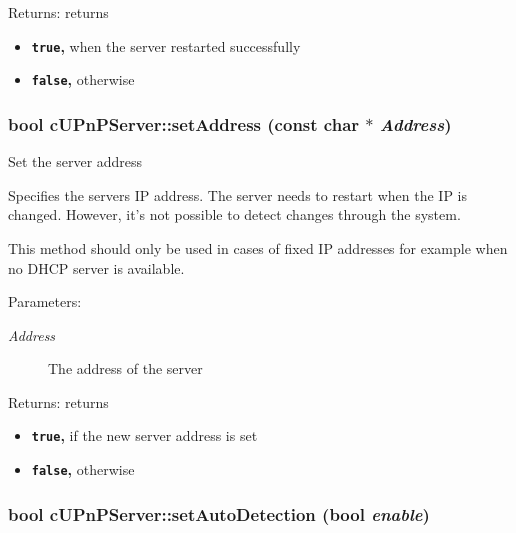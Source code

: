 \begin{Desc}
\item[Returns:]returns\begin{itemize}
\item {\bf {\tt true},} when the server restarted successfully\item {\bf {\tt false},} otherwise \end{itemize}
\end{Desc}
\hypertarget{classcUPnPServer_ebebc8d232cf4ad04e5f72f5ab763db6}{
\subsubsection[{setAddress}]{\setlength{\rightskip}{0pt plus 5cm}bool cUPnPServer::setAddress (const char $\ast$ {\em Address})}}
\label{classcUPnPServer_ebebc8d232cf4ad04e5f72f5ab763db6}


Set the server address

Specifies the servers IP address. The server needs to restart when the IP is changed. However, it's not possible to detect changes through the system.

This method should only be used in cases of fixed IP addresses for example when no DHCP server is available.

\begin{Desc}
\item[Parameters:]
\begin{description}
\item[{\em Address}]The address of the server \end{description}
\end{Desc}
\begin{Desc}
\item[Returns:]returns\begin{itemize}
\item {\bf {\tt true},} if the new server address is set\item {\bf {\tt false},} otherwise \end{itemize}
\end{Desc}
\hypertarget{classcUPnPServer_7c91df7310a99786a0a126497299d030}{
\subsubsection[{setAutoDetection}]{\setlength{\rightskip}{0pt plus 5cm}bool cUPnPServer::setAutoDetection (bool {\em enable})}}
\label{classcUPnPServer_7c91df7310a99786a0a126497299d030}


